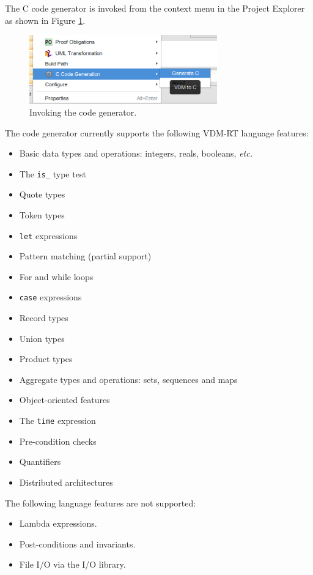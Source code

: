 The C code generator is invoked from the context menu in the Project Explorer as shown in Figure \ref{fig:invoking}.
%
%
%
\begin{figure}[ht]
\centering
\includegraphics[width=3.2in]{figures/overtureCGInvoking.png}
\caption{Invoking the code generator.}
\label{fig:invoking}
\end{figure}
%
%
%
The code generator currently supports the following VDM-RT language features:
%
%
%
\begin{itemize}
\item  Basic data types and operations:  integers, reals, booleans, \emph{etc.}
%
\item  The \texttt{is\_} type test
%
\item  Quote types
%
\item  Token types
%
\item \texttt{let} expressions
%
\item  Pattern matching (partial support)
%
\item  For and while loops
%
\item \texttt{case} expressions
%
\item  Record types
%
\item  Union types
%
\item  Product types
%
\item  Aggregate types and operations:  sets, sequences and maps
%
\item  Object-oriented features
%
\item  The \texttt{time} expression
%
\item  Pre-condition checks
%
\item  Quantifiers
%
\item  Distributed architectures
\end{itemize}
%
%
%
The following language features are not supported:
%
%
%
\begin{itemize}
\item  Lambda expressions.
%
\item  Post-conditions and invariants.
%
\item  File I/O via the I/O library.
\end{itemize}
%
%
%

